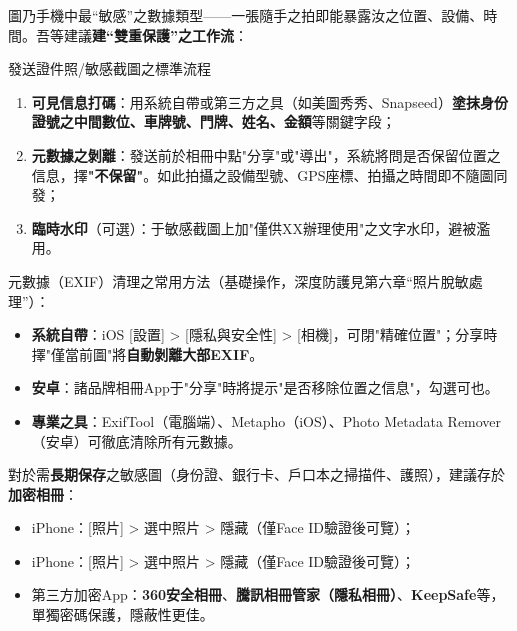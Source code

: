 
圖乃手機中最“敏感”之數據類型——一張隨手之拍即能暴露汝之位置、設備、時間。吾等建議\textbf{建“雙重保護”之工作流}：

\begin{tcbwarn}{發送證件照/敏感截圖之標準流程}
\begin{enumerate}
  \item \textbf{可見信息打碼}：用系統自帶或第三方之具（如美圖秀秀、Snapseed）\textbf{塗抹身份證號之中間數位、車牌號、門牌、姓名、金額}等關鍵字段；
  \item \textbf{元數據之剝離}：發送前於相冊中點"分享"或"導出"，系統將問是否保留位置之信息，擇\textbf{"不保留"}。如此拍攝之設備型號、GPS座標、拍攝之時間即不隨圖同發；
  \item \textbf{臨時水印}（可選）：于敏感截圖上加"僅供XX辦理使用"之文字水印，避被濫用。
\end{enumerate}

\end{tcbwarn}

元數據（EXIF）清理之常用方法（基礎操作，深度防護見第六章“照片脫敏處理”）：

\begin{itemize}
  \item \textbf{系統自帶}：iOS [設置] > [隱私與安全性] > [相機]，可閉"精確位置"；分享時擇"僅當前圖"將\textbf{自動剝離大部EXIF}。
  \item \textbf{安卓}：諸品牌相冊App于"分享"時將提示"是否移除位置之信息"，勾選可也。
  \item \textbf{專業之具}：ExifTool（電腦端）、Metapho（iOS）、Photo Metadata Remover（安卓）可徹底清除所有元數據。
\end{itemize}

對於需\textbf{長期保存}之敏感圖（身份證、銀行卡、戶口本之掃描件、護照），建議存於\textbf{加密相冊}：

\begin{itemize}
  \item iPhone：[照片] > 選中照片 > 隱藏（僅Face ID驗證後可覽）；
  \item iPhone：[照片] > 選中照片 > 隱藏（僅Face ID驗證後可覽）；
  \item 第三方加密App：\textbf{360安全相冊}、\textbf{騰訊相冊管家（隱私相冊）}、\textbf{KeepSafe}等，單獨密碼保護，隱蔽性更佳。
\end{itemize}
